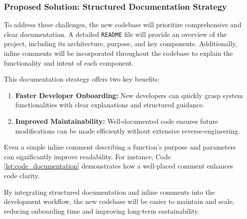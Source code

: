 \subsubsection{Proposed Solution: Structured Documentation Strategy}
To address these challenges, the new codebase will prioritize comprehensive and clear documentation. A detailed \texttt{README} file will provide an overview of the project, including its architecture, purpose, and key components. Additionally, inline comments will be incorporated throughout the codebase to explain the functionality and intent of each component.

This documentation strategy offers two key benefits:
\begin{enumerate}
    \item \textbf{Faster Developer Onboarding:} New developers can quickly grasp system functionalities with clear explanations and structured guidance.
    \item \textbf{Improved Maintainability:} Well-documented code ensures future modifications can be made efficiently without extensive reverse-engineering.
\end{enumerate}

Even a simple inline comment describing a function’s purpose and parameters can significantly improve readability. For instance, Code \ref{lst:code_documentation} demonstrates how a well-placed comment enhances code clarity.

By integrating structured documentation and inline comments into the development workflow, the new codebase will be easier to maintain and scale, reducing onboarding time and improving long-term sustainability.

